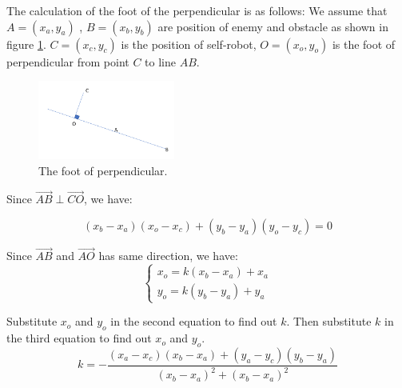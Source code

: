 The calculation of the foot of the perpendicular is as follows:
We assume that $A=(x_{a},y_{a})$ ,  $B=(x_{b},y_{b})$ are position of enemy and obstacle as shown in figure \ref{hiding_implement2}. $C=(x_{c},y_{c})$ is the position of self-robot, $O=(x_{o},y_{o})$ is the foot of perpendicular from point $C$ to line $AB$.

\begin{figure}[thb]
    \centering
    \includegraphics[width=0.4\textwidth]{images/implementofhiding2.png}
    \caption[The foot of perpendicular]{The foot of perpendicular.}\label{hiding_implement2}
\end{figure}
Since $\overrightarrow{AB} \perp  \overrightarrow{CO}$, we have:

\begin{equation}
(x_{b}-x_{a})(x_{o}-x_{c})+(y_{b}-y_{a})(y_{o}-y_{c})=0
\end{equation}

Since $\overrightarrow{AB}$ and $\overrightarrow{AO}$ has same direction, we have:
\begin{equation}
\left\{\begin{matrix}
x_{o}=k({x_{b}}-{x_{a}})+{x_{a}}\\
y_{o}=k({y_{b}}-{y_{a}})+{y_{a}}
\end{matrix}\right.
\end{equation}

Substitute $x_o$ and $y_o$ in the second equation to find out $k$. Then substitute $k$ in the third equation to find out $x_o$ and $y_o$.
\begin{equation}
    k=-\frac{(x_{a}-x_{c})(x_{b}-x_{a})+(y_{a}-y_{c})(y_{b}-y_{a})}{(x_{b}-x_{a})^{2}+(x_{b}-x_{a})^{2}}
\end{equation}

